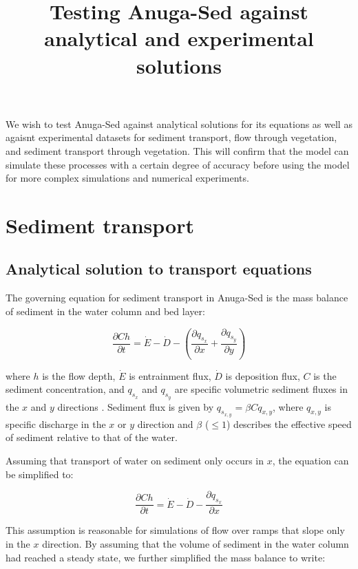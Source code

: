 \documentclass[11pt]{article}
\begin{document}
\title{Testing Anuga-Sed against analytical and experimental solutions}
\maketitle

We wish to test Anuga-Sed against analytical solutions for its equations as well as agaisnt experimental datasets for sediment transport, flow through vegetation, and sediment transport through vegetation. This will confirm that the model can simulate these processes with a certain degree of accuracy before using the model for more complex simulations and numerical experiments.

\section{Sediment transport}

\subsection{Analytical solution to transport equations}

The governing equation for sediment transport in Anuga-Sed is the mass balance of sediment in the water column and bed layer:

\begin{equation}
\frac{\partial C h}{\partial t} = \dot{E} - \dot{D} - \left(\frac{\partial q_{s_x}}{\partial x} + \frac{\partial q_{s_y}}{\partial y} \right)
\end{equation}

\noindent where $h$ is the flow depth, $\dot{E}$ is entrainment flux, $\dot{D}$ is deposition flux, $C$ is the sediment concentration, and $q_{s_x}$ and $q_{s_y}$ are specific volumetric sediment fluxes in the $x$ and $y$ directions \citep[e.g.,][]{davy2009fluvial}. Sediment flux is given by $q_{s_{x,y}} = \beta C q_{x,y}$, where $q_{x,y}$ is specific discharge in the $x$ or $y$ direction and $\beta$ ($\le 1$) describes the effective speed of sediment relative to that of the water.

Assuming that transport of water on sediment only occurs in $x$, the equation can be simplified to:

\begin{equation}
\frac{\partial C h}{\partial t} = \dot{E} - \dot{D} - \frac{\partial q_{s_x}}{\partial x}
\end{equation}

This assumption is reasonable for simulations of flow over ramps that slope only in the $x$ direction. By assuming that the volume of sediment in the water column had reached a steady state, we further simplified the mass balance to write:
\end{document}
